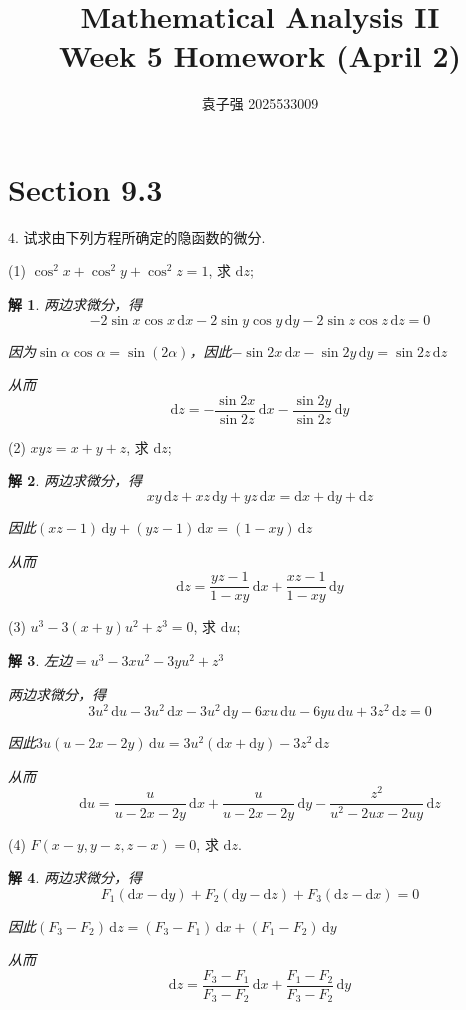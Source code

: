 \documentclass[a4paper,12pt]{article}
\title{Mathematical Analysis II\\Week 5 Homework (April 2)}
\author{袁子强\hspace{1cm} 2025533009}
\newtheorem*{sol}{解}
\begin{document}
\maketitle

\section*{Section 9.3}

4. 试求由下列方程所确定的隐函数的微分.

(1) $\cos^2 x + \cos^2 y + \cos^2 z = 1$, 求 $\mathrm{d}z$;
\begin{sol}
    两边求微分，得
    $$-2\sin x\cos x\,\mathrm{d}x - 2\sin y\cos y\,\mathrm{d}y - 2\sin z\cos z\,\mathrm{d}z = 0$$

    因为$\sin\alpha\cos\alpha = \sin(2\alpha)$，因此$-\sin 2x\,\mathrm{d}x - \sin 2y\,\mathrm{d}y = \sin 2z\,\mathrm{d}z$

    从而
    $$\mathrm{d}z = -\frac{\sin 2x}{\sin 2z}\,\mathrm{d}x - \frac{\sin 2y}{\sin 2z}\,\mathrm{d}y$$
\end{sol}

(2) $xyz = x + y + z$, 求 $\mathrm{d}z$;
\begin{sol}
    两边求微分，得
    $$xy\,\mathrm{d}z + xz\,\mathrm{d}y + yz\,\mathrm{d}x = \mathrm{d}x + \mathrm{d}y + \mathrm{d}z$$

    因此$(xz - 1)\,\mathrm{d}y + (yz - 1)\,\mathrm{d}x = (1 - xy)\,\mathrm{d}z$

    从而
    $$\mathrm{d}z = \frac{yz - 1}{1 - xy}\,\mathrm{d}x + \frac{xz - 1}{1 - xy}\,\mathrm{d}y$$
\end{sol}

(3) $u^3 - 3(x+y)u^2 + z^3 = 0$, 求 $\mathrm{d}u$;
\begin{sol}
    左边$= u^3 - 3xu^2 - 3yu^2 + z^3$

    两边求微分，得
    $$3u^2\,\mathrm{d}u - 3u^2\,\mathrm{d}x - 3u^2\,\mathrm{d}y - 6xu\,\mathrm{d}u - 6yu\,\mathrm{d}u + 3z^2\,\mathrm{d}z = 0$$

    因此$3u(u - 2x - 2y)\,\mathrm{d}u = 3u^2(\mathrm{d}x + \mathrm{d}y) - 3z^2\,\mathrm{d}z$

    从而
    $$\mathrm{d}u = \frac{u}{u - 2x - 2y}\,\mathrm{d}x + \frac{u}{u - 2x - 2y}\,\mathrm{d}y - \frac{z^2}{u^2 - 2ux - 2uy}\,\mathrm{d}z$$
\end{sol}

(4) $F(x-y, y-z, z-x) = 0$, 求 $\mathrm{d}z$.
\begin{sol}
    两边求微分，得
    $$F_1(\mathrm{d}x - \mathrm{d}y) + F_2(\mathrm{d}y - \mathrm{d}z) + F_3(\mathrm{d}z - \mathrm{d}x) = 0$$

    因此$(F_3 - F_2)\,\mathrm{d}z = (F_3 - F_1)\,\mathrm{d}x + (F_1 - F_2)\,\mathrm{d}y$

    从而
    $$\mathrm{d}z = \frac{F_3 - F_1}{F_3 - F_2}\,\mathrm{d}x + \frac{F_1 - F_2}{F_3 - F_2}\,\mathrm{d}y$$
\end{sol}
\end{document}
